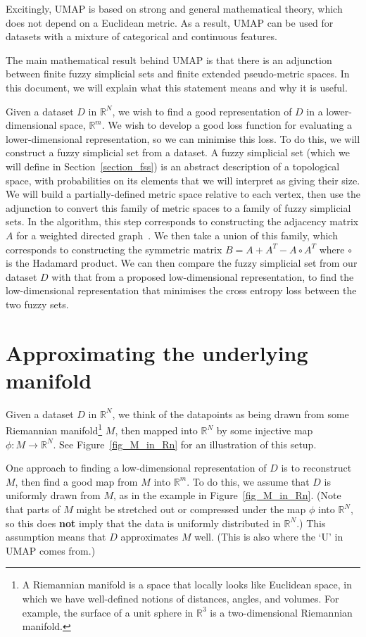 \documentclass[a4paper,11pt,leqno]{article} \usepackage{amsmath}
\newcommand{\RR}{\mathbb{R}} \newcommand{\QQ}{\mathbb{Q}}
\theoremstyle{definition}
\begin{document}
Excitingly, UMAP is based on strong and general mathematical theory, which does
not depend on a Euclidean metric.
As a result, UMAP can be used for datasets with a mixture of categorical and
continuous features.

The main mathematical result behind UMAP is that there is an adjunction between
finite fuzzy simplicial sets and finite extended pseudo-metric spaces.
In this document, we will explain what this statement means and why it is
useful.

Given a dataset $D$ in $\RR^N$, we wish to find a good representation of $D$ in
a lower-dimensional space, $\RR^m$.
We wish to develop a good loss function for evaluating a lower-dimensional
representation, so we can minimise this loss.
To do this, we will construct a fuzzy simplicial set from a dataset.
A fuzzy simplicial set (which we will define in Section~\ref{section_fss}) is
an abstract description of a topological space, with probabilities on its
elements that we will interpret as giving their size.
We will build a partially-defined metric space relative to each vertex, then
use the adjunction to convert this family of metric spaces to a family of fuzzy
simplicial sets.
In the algorithm, this step corresponds to constructing the adjacency matrix
$A$ for a weighted directed graph~\cite[Section 3.1]{McInnes18}.
We then take a union of this family, which corresponds to constructing the
symmetric matrix $B = A+A^T-A\circ A^T$ where $\circ$ is the Hadamard product.
We can then compare the fuzzy simplicial set from our dataset $D$ with that
from a proposed low-dimensional representation, to find the low-dimensional
representation that minimises the cross entropy loss between the two fuzzy
sets.

\section{Approximating the underlying manifold}
\label{section_uniform}

Given a dataset $D$ in $\RR^N$, we think of the datapoints as being drawn from
some Riemannian manifold\footnote{
  A Riemannian manifold is a space that locally looks like Euclidean space, in
  which we have well-defined notions of distances, angles, and volumes.
  For example, the surface of a unit sphere in $\RR^3$ is a two-dimensional
  Riemannian manifold.
} $M$, then mapped into $\RR^N$ by some injective map $\phi: M\to\RR^N$.
See Figure~\ref{fig_M_in_Rn} for an illustration of this setup.

One approach to finding a low-dimensional representation of $D$ is to
reconstruct $M$, then find a good map from $M$ into $\RR^m$.
To do this, we assume that $D$ is uniformly drawn from $M$, as in
the example in Figure~\ref{fig_M_in_Rn}.
(Note that parts of $M$ might be stretched out or compressed under the map
$\phi$ into $\RR^N$, so this does {\textbf{not}} imply that the data is
uniformly distributed in $\RR^N$.)
This assumption means that $D$ approximates $M$ well.
(This is also where the `U' in UMAP comes from.)
\end{document}
